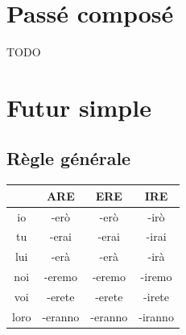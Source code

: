 \documentclass[12pt, openany]{report}
\begin{document}
\section{Passé composé}
TODO
\section{Futur simple}
\subsection{Règle générale}
\begin{center}
    \begin{tabular}{c|c|c|c}
        & ARE & ERE & IRE\\ \hline
        io & -erò & -erò & -irò\\
        tu & -erai & -erai & -irai\\
        lui & -erà & -erà & -irà\\
        noi & -eremo & -eremo & -iremo\\
        voi & -erete & -erete & -irete\\
        loro & -eranno & -eranno & -iranno\\
    \end{tabular}
\end{center} 
\end{document}
